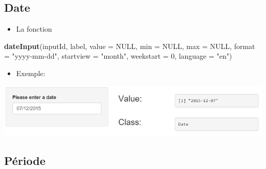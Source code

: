 \documentclass[]{article}
\newenvironment{Shaded}{\begin{snugshade}}{\end{snugshade}}
\newcommand{\KeywordTok}[1]{\textcolor[rgb]{0.13,0.29,0.53}{\textbf{#1}}}
\newcommand{\DataTypeTok}[1]{\textcolor[rgb]{0.13,0.29,0.53}{#1}}
\newcommand{\DecValTok}[1]{\textcolor[rgb]{0.00,0.00,0.81}{#1}}
\newcommand{\StringTok}[1]{\textcolor[rgb]{0.31,0.60,0.02}{#1}}
\newcommand{\CommentTok}[1]{\textcolor[rgb]{0.56,0.35,0.01}{\textit{#1}}}
\newcommand{\OtherTok}[1]{\textcolor[rgb]{0.56,0.35,0.01}{#1}}
\newcommand{\NormalTok}[1]{#1}
\providecommand{\tightlist}{%
  \setlength{\itemsep}{0pt}\setlength{\parskip}{0pt}}
\begin{document}
\subsection{Date}\label{date}

\begin{itemize}
\tightlist
\item
  La fonction
\end{itemize}

\begin{Shaded}
\begin{Highlighting}[]
\KeywordTok{dateInput}\NormalTok{(inputId, label, }\DataTypeTok{value =} \OtherTok{NULL}\NormalTok{, }\DataTypeTok{min =} \OtherTok{NULL}\NormalTok{, }\DataTypeTok{max =} \OtherTok{NULL}\NormalTok{, }\DataTypeTok{format =} \StringTok{"yyyy-mm-dd"}\NormalTok{, }
          \DataTypeTok{startview =} \StringTok{"month"}\NormalTok{, }\DataTypeTok{weekstart =} \DecValTok{0}\NormalTok{, }\DataTypeTok{language =} \StringTok{"en"}\NormalTok{)}
\end{Highlighting}
\end{Shaded}

\begin{itemize}
\tightlist
\item
  Exemple:
\end{itemize}

\begin{Shaded}
\end{Shaded}

\includegraphics{img/date.png}

\subsection{Période}\label{periode}
\end{document}
